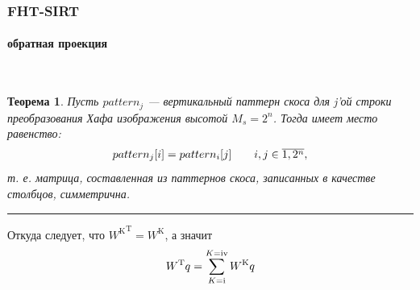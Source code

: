 \documentclass[12pt]{beamer}
\newcommand{\rom}[1]{%
  \textup{\uppercase\expandafter{\romannumeral#1}}%
}
\begin{document}
\begin{frame}
\frametitle{FHT-SIRT}
\framesubtitle{обратная проекция}

\begingroup
\small
\vspace{-0.5cm}
\newtheorem{myth}{Теорема}\
\begin{myth}
Пусть $pattern_j$ --- вертикальный паттерн скоса для j'ой строки преобразования Хафа изображения высотой $M_s = 2^n$.
Тогда имеет место равенство:
\begin{equation} \notag
\label{statement1}
\begin{array}{l l}
pattern_j[i] = pattern_i[j] & \quad  i,j \in \overline{1, 2^n},
\end{array}
\end{equation}
т. е. матрица, составленная из паттернов скоса, записанных в качестве столбцов, симметрична.
\end{myth}
\endgroup
\noindent\rule{8cm}{0.4pt}
\vspace{0.3cm}

Откуда следует, что ${W^{\mathrm K}} ^ {\mathrm T} = W^{\mathrm K}$, а значит
$$
W^{\mathrm T} q = \sum_{K=\rom{1}}^{K=\rom{4}}{W^{\mathrm K} q}
$$

\end{frame}
\end{document}
